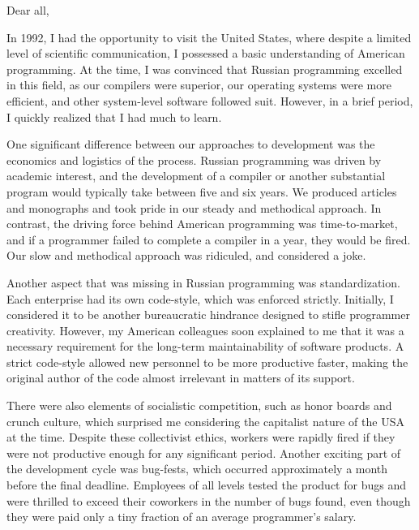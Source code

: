 \cleardoublepage
{}

Dear all,

In 1992, I had the opportunity to visit the United States, where despite a limited level of scientific communication, I possessed a basic understanding of American programming. At the time, I was convinced that Russian programming excelled in this field, as our compilers were superior, our operating systems were more efficient, and other system-level software followed suit. However, in a brief period, I quickly realized that I had much to learn.

One significant difference between our approaches to development was the economics and logistics of the process. Russian programming was driven by academic interest, and the development of a compiler or another substantial program would typically take between five and six years. We produced articles and monographs and took pride in our steady and methodical approach. In contrast, the driving force behind American programming was time-to-market, and if a programmer failed to complete a compiler in a year, they would be fired. Our slow and methodical approach was ridiculed, and considered a joke.

Another aspect that was missing in Russian programming was standardization. Each enterprise had its own code-style, which was enforced strictly. Initially, I considered it to be another bureaucratic hindrance designed to stifle programmer creativity. However, my American colleagues soon explained to me that it was a necessary requirement for the long-term maintainability of software products. A strict code-style allowed new personnel to be more productive faster, making the original author of the code almost irrelevant in matters of its support.

There were also elements of socialistic competition, such as honor boards and crunch culture, which surprised me considering the capitalist nature of the USA at the time. Despite these collectivist ethics, workers were rapidly fired if they were not productive enough for any significant period. Another exciting part of the development cycle was bug-fests, which occurred approximately a month before the final deadline. Employees of all levels tested the product for bugs and were thrilled to exceed their coworkers in the number of bugs found, even though they were paid only a tiny fraction of an average programmer's salary.

